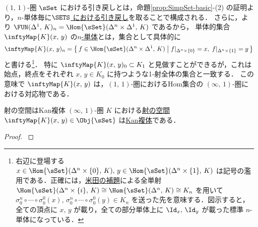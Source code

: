 \documentclass[TQFT_main]{subfiles}
\begin{document}
$(1,\, 1)$-圏 $\sSet$ における引き戻しとは，命題\ref{prop:SimpSet-basic}-(2) の証明より，$n$-単体毎に\hyperref[def:pullback-pushout]{$\SETS$ における引き戻し}を取ることで構成される．
さらに，より $\FUN (\Delta^1,\, K)_n = \Hom{\sSet}(\Delta^n \times \Delta^1,\, K)$ であるから，
単体的集合 $\inftyMap{K} (x,\, y)$ の\hyperref[def:SimpSet]{$n$-単体}とは，集合として具体的に
\begin{align}
    \inftyMap{K} (x,\, y)_n = \bigl\{\, f \in \Hom{\sSet}(\Delta^n \times \Delta^1,\, K) \bigm| f|_{\Delta^n \times \{0\}} = x,\; f|_{\Delta^n \times \{1\}} = y \,\bigr\} 
\end{align}
と書ける\footnote{右辺に登場する $x \in \Hom{\sSet}(\Delta^n \times \{0\},\, K),\, y \in \Hom{\sSet}(\Delta^n \times \{1\},\, K)$ は記号の濫用である．正確には，\hyperref[lem:Yoneda]{米田の補題}による全単射 $\Hom{\sSet}(\Delta^n \times \{i\},\, K) \cong \Hom{\sSet}(\Delta^n,\, K) \cong K_n$ を用いて $\sigma^n_0 \circ \cdots \circ \sigma^0_0 (x),\, \sigma^n_0 \circ \cdots \circ \sigma^0_0 (y) \in K_n$ を送った先を意味する．図示すると，全ての頂点に $x,\, y$ が載り，全ての部分単体上に $\Id_x,\, \Id_y$ が載った標準 $n$-単体になっている．}．
特に $\inftyMap{K} (x,\, y)_0 \subset K_1$ と見做すことができるが，これは始点，終点をそれぞれ $x,\, y \in K_0$ に持つような1-射全体の集合と一致する．
この意味で $\inftyMap{K}(x,\, y)$ は，$(1,\, 1)$-圏におけるHom集合の $(\infty,\, 1)$-圏における対応物である．

\begin{myprop}[label=prop:Map-is-Kan]{射の空間はKan複体}
    $(\infty,\, 1)$-圏 $K$ における\hyperref[def:Map]{射の空間} $\inftyMap{K}(x,\, y) \in \Obj{\sSet}$ は\hyperref[def:infinity-1]{Kan複体}である．
\end{myprop}

\begin{proof}
    \cite[\href{https://kerodon.net/tag/01JC}{Tag 01JC}]{kerodon}
\end{proof}
\end{document}
